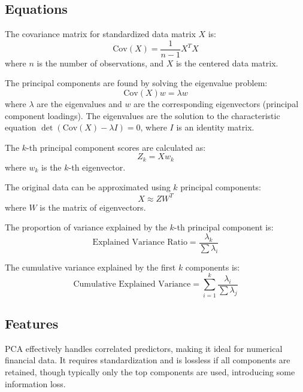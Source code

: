 \documentclass{article}
\begin{document}
\subsection{Equations}
The covariance matrix for standardized data matrix \(X\) is:
\[
\text{Cov}(X) = \frac{1}{n-1} X^T X
\]
where \(n\) is the number of observations, and \(X\) is the centered data matrix.

The principal components are found by solving the eigenvalue problem:
\[
\text{Cov}(X) w = \lambda w
\]
where \(\lambda\) are the eigenvalues and \(w\) are the corresponding eigenvectors (principal component loadings). The eigenvalues are the solution to the characteristic equation \(\det(\text{Cov}(X) - \lambda I) = 0\), where \(I\) is an identity matrix.

The \(k\)-th principal component scores are calculated as:
\[
Z_k = X w_k
\]
where \(w_k\) is the \(k\)-th eigenvector.

The original data can be approximated using \(k\) principal components:
\[
X \approx Z W^T
\]
where \(W\) is the matrix of eigenvectors.

The proportion of variance explained by the \(k\)-th principal component is:
\[
\text{Explained Variance Ratio} = \frac{\lambda_k}{\sum \lambda_i}
\]

The cumulative variance explained by the first \(k\) components is:
\[
\text{Cumulative Explained Variance} = \sum_{i=1}^k \frac{\lambda_i}{\sum \lambda_j}
\]

\subsection{Features}
PCA effectively handles correlated predictors, making it ideal for numerical financial data. It requires standardization and is lossless if all components are retained, though typically only the top components are used, introducing some information loss.
\end{document}
